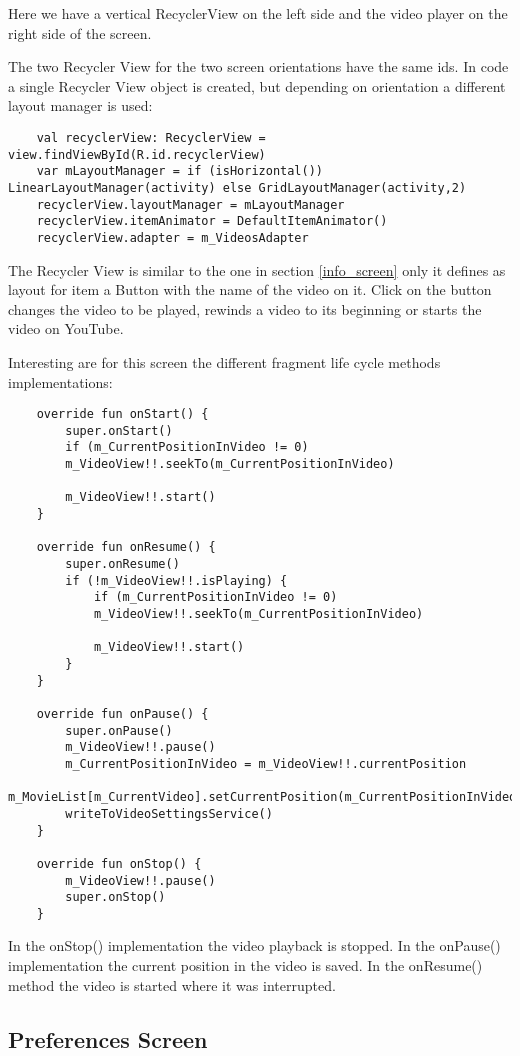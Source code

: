 Here we have a vertical RecyclerView on the left side and the video player on the right side of the screen.

The two Recycler View for the two screen orientations have the same ids. In code a single Recycler View object is created, but depending on orientation a different layout manager is used:

\begin{lstlisting}
	val recyclerView: RecyclerView = view.findViewById(R.id.recyclerView)
	var mLayoutManager = if (isHorizontal()) LinearLayoutManager(activity) else GridLayoutManager(activity,2)
	recyclerView.layoutManager = mLayoutManager
	recyclerView.itemAnimator = DefaultItemAnimator()
	recyclerView.adapter = m_VideosAdapter
\end{lstlisting}

The Recycler View is similar to the one in section \ref{info_screen} only it defines as layout for item a Button with the name of the video on it. Click on the button changes the video to be played, rewinds a video to its beginning or starts the video on YouTube.

Interesting are for this screen the different fragment life cycle methods implementations:

\begin{lstlisting}
	override fun onStart() {
		super.onStart()
		if (m_CurrentPositionInVideo != 0)
		m_VideoView!!.seekTo(m_CurrentPositionInVideo)
		
		m_VideoView!!.start()
	}
	
	override fun onResume() {
		super.onResume()
		if (!m_VideoView!!.isPlaying) {
			if (m_CurrentPositionInVideo != 0)
			m_VideoView!!.seekTo(m_CurrentPositionInVideo)
			
			m_VideoView!!.start()
		}
	}
	
	override fun onPause() {
		super.onPause()
		m_VideoView!!.pause()
		m_CurrentPositionInVideo = m_VideoView!!.currentPosition
		m_MovieList[m_CurrentVideo].setCurrentPosition(m_CurrentPositionInVideo)
		writeToVideoSettingsService()
	}
	
	override fun onStop() {
		m_VideoView!!.pause()
		super.onStop()
	}
\end{lstlisting}

In the onStop() implementation the video playback is stopped. In the onPause() implementation the current position in the video is saved. In the onResume() method the video is started where it was interrupted. 

\subsection{Preferences Screen}

